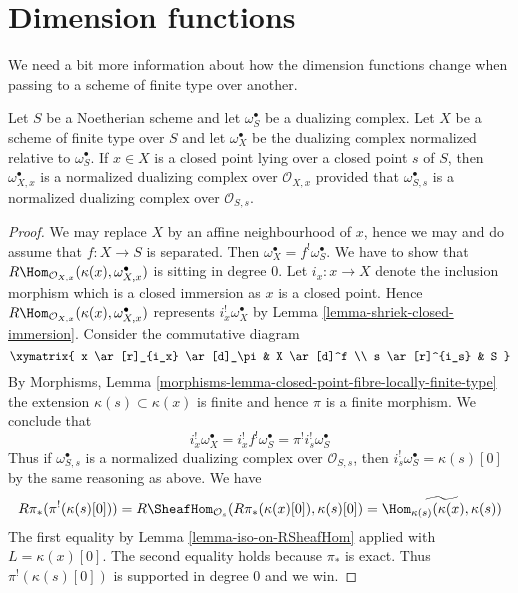 \section{Dimension functions}
\label{section-dimension-functions}

\noindent
We need a bit more information about how the dimension functions change
when passing to a scheme of finite type over another.

\begin{lemma}
\label{lemma-good-dualizing-normalized}
Let $S$ be a Noetherian scheme and let $\omega_S^\bullet$ be a
dualizing complex. Let $X$ be a scheme of finite type over $S$ and let
$\omega_X^\bullet$ be the dualizing complex normalized relative
to $\omega_S^\bullet$. If $x \in X$ is a closed point lying over
a closed point $s$ of $S$, then $\omega_{X, x}^\bullet$
is a normalized dualizing complex over $\mathcal{O}_{X, x}$
provided that $\omega_{S, s}^\bullet$ is a normalized dualizing
complex over $\mathcal{O}_{S, s}$.
\end{lemma}

\begin{proof}
We may replace $X$ by an affine neighbourhood of $x$, hence we may
and do assume that $f : X \to S$ is separated.
Then $\omega_X^\bullet = f^!\omega_S^\bullet$. We have to show that
$R\Hom_{\mathcal{O}_{X, x}}(\kappa(x), \omega_{X, x}^\bullet)$
is sitting in degree $0$. Let $i_x : x \to X$ denote the inclusion
morphism which is a closed immersion as $x$ is a closed point.
Hence $R\Hom_{\mathcal{O}_{X, x}}(\kappa(x), \omega_{X, x}^\bullet)$
represents $i_x^!\omega_X^\bullet$ by
Lemma \ref{lemma-shriek-closed-immersion}.
Consider the commutative diagram
$$
\xymatrix{
x \ar[r]_{i_x} \ar[d]_\pi & X \ar[d]^f \\
s \ar[r]^{i_s} & S
}
$$
By Morphisms, Lemma
\ref{morphisms-lemma-closed-point-fibre-locally-finite-type}
the extension $\kappa(s) \subset \kappa(x)$ is finite and hence
$\pi$ is a finite morphism. We conclude that
$$
i_x^!\omega_X^\bullet = i_x^! f^! \omega_S^\bullet =
\pi^! i_s^! \omega_S^\bullet
$$
Thus if $\omega_{S, s}^\bullet$ is a normalized dualizing complex
over $\mathcal{O}_{S, s}$, then $i_s^!\omega_S^\bullet = \kappa(s)[0]$
by the same reasoning as above. We have
$$
R\pi_*(\pi^!(\kappa(s)[0])) =
R\SheafHom_{\mathcal{O}_s}(R\pi_*(\kappa(x)[0]), \kappa(s)[0]) =
\widetilde{\Hom_{\kappa(s)}(\kappa(x), \kappa(s))}
$$
The first equality by Lemma \ref{lemma-iso-on-RSheafHom}
applied with $L = \kappa(x)[0]$. The second equality holds because
$\pi_*$ is exact.
Thus $\pi^!(\kappa(s)[0])$ is supported in degree $0$ and we win.
\end{proof}

